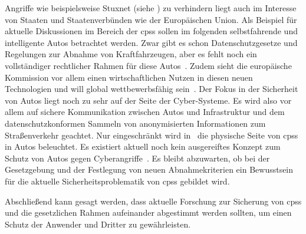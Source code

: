 \documentclass[final,bibliography=totocnumbered]{include/sikseminar}
\newcommand{\cps}{\glspl{cps}\xspace}
\begin{document}
    Angriffe wie beispielsweise Stuxnet (siehe ) zu verhindern liegt auch im Interesse von Staaten und Staatenverbünden wie der Europäischen Union.
    Als Beispiel für aktuelle Diskussionen im Bereich der \cps sollen im folgenden selbstfahrende und intelligente Autos betrachtet werden.
    Zwar gibt es schon Datenschutzgesetze und Regelungen zur Abnahme von Kraftfahrzeugen, aber es fehlt noch ein vollständiger rechtlicher Rahmen für diese Autos~\cite{EuropeanCommission2018}.
    Zudem sieht die europäische Kommission vor allem einen wirtschaftlichen Nutzen in diesen neuen Technologien und will global wettbewerbsfähig sein~\cite{EuropeanCommission2018}.
    Der Fokus in der Sicherheit von Autos liegt noch zu sehr auf der Seite der Cyber-Systeme.
    Es wird also vor allem auf sichere Kommunikation zwischen Autos und Infrastruktur und dem datenschutzkonformen Sammeln von anonymisierten Informationen zum Straßenverkehr geachtet.
    Nur eingeschränkt wird in~\cite{EuropeanCommission2018} die physische Seite von \cps in Autos beleuchtet.
    Es existiert aktuell noch kein ausgereiftes Konzept zum Schutz von Autos gegen Cyberangriffe~\cite{EuropeanCommission2018}.
    Es bleibt abzuwarten, ob bei der Gesetzgebung und der Festlegung von neuen Abnahmekriterien ein Bewusstsein für die aktuelle Sicherheitsproblematik von \cps gebildet wird.

    Abschließend kann gesagt werden, dass aktuelle Forschung zur Sicherung von \cps und die gesetzlichen Rahmen aufeinander abgestimmt werden sollten, um einen Schutz der Anwender und Dritter zu gewährleisten.

    \newpage

    \printbibliography
    \newpage
\end{document}
